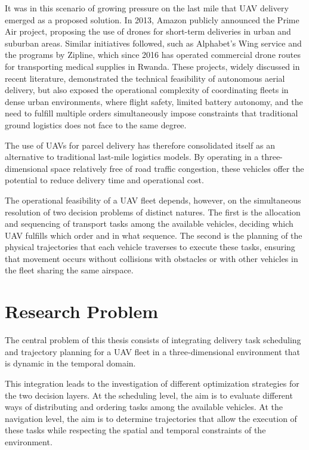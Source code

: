 It was in this scenario of growing pressure on the last mile that UAV delivery emerged as a proposed solution. In 2013, Amazon publicly announced the Prime Air project, proposing the use of drones for short-term deliveries in urban and suburban areas. Similar initiatives followed, such as Alphabet's Wing service and the programs by Zipline, which since 2016 has operated commercial drone routes for transporting medical supplies in Rwanda. These projects, widely discussed in recent literature, demonstrated the technical feasibility of autonomous aerial delivery, but also exposed the operational complexity of coordinating fleets in dense urban environments, where flight safety, limited battery autonomy, and the need to fulfill multiple orders simultaneously impose constraints that traditional ground logistics does not face to the same degree.

The use of UAVs for parcel delivery has therefore consolidated itself as an alternative to traditional last-mile logistics models. By operating in a three-dimensional space relatively free of road traffic congestion, these vehicles offer the potential to reduce delivery time and operational cost.

The operational feasibility of a UAV fleet depends, however, on the simultaneous resolution of two decision problems of distinct natures. The first is the allocation and sequencing of transport tasks among the available vehicles, deciding which UAV fulfills which order and in what sequence. The second is the planning of the physical trajectories that each vehicle traverses to execute these tasks, ensuring that movement occurs without collisions with obstacles or with other vehicles in the fleet sharing the same airspace.

\section{Research Problem}

The central problem of this thesis consists of integrating delivery task scheduling and trajectory planning for a UAV fleet in a three-dimensional environment that is dynamic in the temporal domain.

This integration leads to the investigation of different optimization strategies for the two decision layers. At the scheduling level, the aim is to evaluate different ways of distributing and ordering tasks among the available vehicles. At the navigation level, the aim is to determine trajectories that allow the execution of these tasks while respecting the spatial and temporal constraints of the environment.

